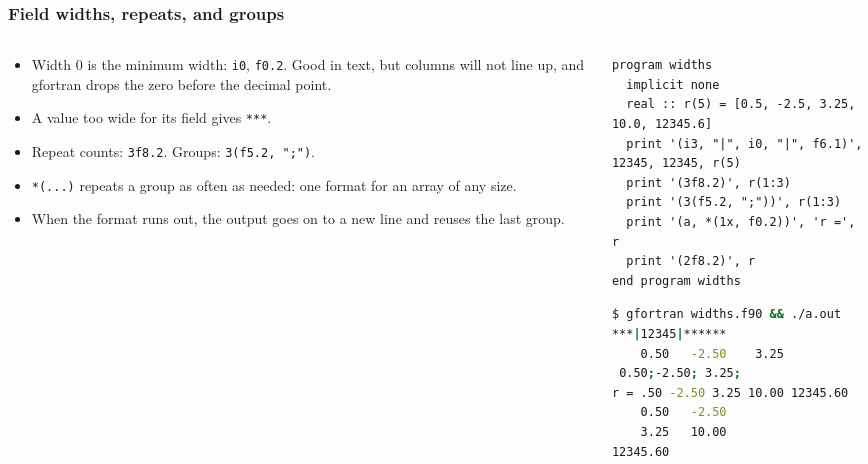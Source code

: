 \begin{frame}[fragile]
  \frametitle{Field widths, repeats, and groups}
  \begin{columns}[T]
    \begin{column}{0.45\textwidth}
      \begin{itemize}
        \item Width 0 is the minimum width: \texttt{i0}, \texttt{f0.2}. Good in text, but columns will not line up, and gfortran drops the zero before the decimal point.
        \item A value too wide for its field gives \texttt{***}.
        \item Repeat counts: \texttt{3f8.2}. Groups: \texttt{3(f5.2, ";")}.
        \item \texttt{*(...)} repeats a group as often as needed: one format for an array of any size.
        \item When the format runs out, the output goes on to a new line and reuses the last group.
      \end{itemize}
    \end{column}

    \begin{column}{0.55\textwidth}
      \begin{lstlisting}
program widths
  implicit none
  real :: r(5) = [0.5, -2.5, 3.25, 10.0, 12345.6]
  print '(i3, "|", i0, "|", f6.1)', 12345, 12345, r(5)
  print '(3f8.2)', r(1:3)
  print '(3(f5.2, ";"))', r(1:3)
  print '(a, *(1x, f0.2))', 'r =', r
  print '(2f8.2)', r
end program widths
      \end{lstlisting}
      \begin{lstlisting}[language=bash]
$ gfortran widths.f90 && ./a.out
***|12345|******
    0.50   -2.50    3.25
 0.50;-2.50; 3.25;
r = .50 -2.50 3.25 10.00 12345.60
    0.50   -2.50
    3.25   10.00
12345.60
      \end{lstlisting}
    \end{column}
  \end{columns}
\end{frame}


